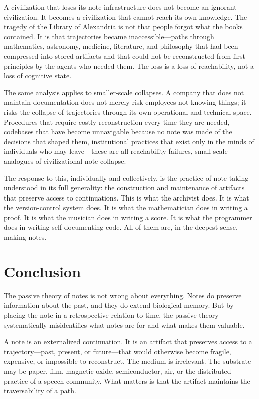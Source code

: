 \documentclass[12pt, a4paper]{article}
\begin{document}
A civilization that loses its note infrastructure does not become an ignorant
civilization. It becomes a civilization that cannot reach its own knowledge. The
tragedy of the Library of Alexandria is not that people forgot what the books
contained. It is that trajectories became inaccessible---paths through mathematics,
astronomy, medicine, literature, and philosophy that had been compressed into
stored artifacts and that could not be reconstructed from first principles by the
agents who needed them. The loss is a loss of reachability, not a loss of
cognitive state.

The same analysis applies to smaller-scale collapses. A company that does not
maintain documentation does not merely risk employees not knowing things; it risks
the collapse of trajectories through its own operational and technical space.
Procedures that require costly reconstruction every time they are needed, codebases
that have become unnavigable because no note was made of the decisions that shaped
them, institutional practices that exist only in the minds of individuals who may
leave---these are all reachability failures, small-scale analogues of civilizational
note collapse.

The response to this, individually and collectively, is the practice of
note-taking understood in its full generality: the construction and maintenance of
artifacts that preserve access to continuations. This is what the archivist does.
It is what the version-control system does. It is what the mathematician does in
writing a proof. It is what the musician does in writing a score. It is what the
programmer does in writing self-documenting code. All of them are, in the deepest
sense, making notes.

\section{Conclusion}

The passive theory of notes is not wrong about everything. Notes do preserve
information about the past, and they do extend biological memory. But by placing
the note in a retrospective relation to time, the passive theory systematically
misidentifies what notes are for and what makes them valuable.

A note is an externalized continuation. It is an artifact that preserves access to
a trajectory---past, present, or future---that would otherwise become fragile,
expensive, or impossible to reconstruct. The medium is irrelevant. The substrate
may be paper, film, magnetic oxide, semiconductor, air, or the distributed
practice of a speech community. What matters is that the artifact maintains the
traversability of a path.
\end{document}
